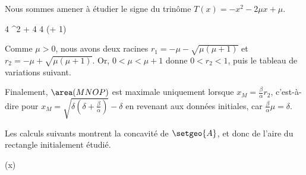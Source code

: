 Nous sommes amener à étudier le signe du trinôme
$T(x) = - x^2 - 2 \mu x + \mu$.

\smallskip
\begin{stepcalc}[style=sar]
    \Delta
\explnext{}
    4 \mu^2 + 4 \mu
\explnext{}
    4 \mu (\mu + 1)
\end{stepcalc}
\smallskip

Comme $\mu > 0$, nous avons deux racines
$r_1 = - \mu - \sqrt{\mu (\mu + 1)}$
et
$r_2 = - \mu + \sqrt{\mu (\mu + 1)}$.
Or,
$0 < \mu < \mu + 1$
donne
$0 < r_2 < 1$,
puis
le tableau de variations suivant.
%
\begin{center}
\end{center}


Finalement,
$\area(MNOP)$ est maximale uniquement lorsque
$x_M = \frac{\beta}{\alpha} r_2$,
c'est-à-dire pour %
$x_M = \sqrt{\delta (\delta + \frac{\beta}{\alpha})} - \delta$
en revenant aux données initiales, car $\frac{\beta}{\alpha} \mu = \delta$.




\begin{remark}
    Les calculs suivants montrent la concavité de $\setgeo{A}$, et donc de l'aire du rectangle initialement étudié.

    \smallskip
    \begin{stepcalc}[style=sar]
        (x)
    \explnext{}
    \explnext{}
    \explnext{}
    \end{stepcalc}
\end{remark}




